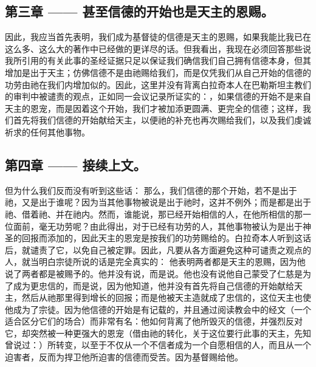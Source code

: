 
\subsection{第三章 —— 甚至信德的开始也是天主的恩赐。}

因此，我应当首先表明，我们成为基督徒的信德是天主的恩赐，如果我能比我已在这么多、这么大的著作中已经做的更详尽的话。但我看出，我现在必须回答那些说我所引用的有关此事的圣经证据只足以保证我们确信我们自己拥有信德本身，但其增加是出于天主；仿佛信德不是由祂赐给我们，而是仅凭我们从自己开始的信德的功劳由祂在我们内增加似的。因此，这里并没有背离白拉奇本人在巴勒斯坦主教们的审判中被谴责的观点，正如同一会议记录所证实的：，如果信德的开始不是来自天主的恩宠，而是因着这个开始，我们才被加添更圆满、更完全的信德；这样，我们首先将我们信德的开始献给天主，以便祂的补充也再次赐给我们，以及我们虔诚祈求的任何其他事物。\par


\subsection{第四章 —— 接续上文。}

但为什么我们反而没有听到这些话： 那么，我们信德的那个开始，若不是出于祂，又是出于谁呢？因为当其他事物被说是出于祂时，这并不例外；而是都是出于祂、借着祂、并在祂内。然而，谁能说，那已经开始相信的人，在他所相信的那一位面前，毫无功劳呢？由此得出，对于已经有功劳的人，其他事物被认为是出于神圣的回报而添加的，因此天主的恩宠是按我们的功劳赐给的。白拉奇本人听到这话后，就谴责了它，以免自己被定罪。因此，凡要从各方面避免这种可谴责之观点的人，就当明白宗徒所说的话是完全真实的： 他表明两者都是天主的恩赐，因为他说了两者都是被赐予的。他并没有说，而是说。他也没有说他自己蒙受了仁慈是为了成为更忠信的，而是说，因为他知道，他并没有首先将自己信德的开始献给天主，然后从祂那里得到增长的回报；而是他被天主造就成了忠信的，这位天主也使他成为了宗徒。因为他信德的开始是有记载的，并且通过阅读教会中的经文（一个适合区分它们的场合）而非常有名：他如何背离了他所毁灭的信德，并强烈反对它，却突然被一种更强大的恩宠（借由祂的转化，关于这位要行此事的天主，先知曾说过：）所转变，以至于不仅从一个不信者成为一个自愿相信的人，而且从一个迫害者，反而为捍卫他所迫害的信德而受苦。因为基督赐给他。\par

